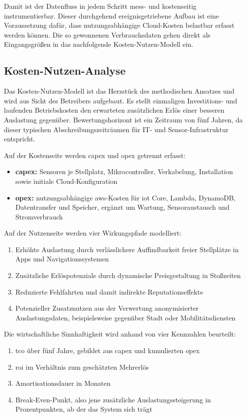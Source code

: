 Damit ist der Datenfluss in jedem Schritt mess- und kostenseitig instrumentierbar. Dieser durchgehend ereignisgetriebene Aufbau ist eine Voraussetzung dafür, dass nutzungsabhängige Cloud-Kosten belastbar erfasst werden können. Die so gewonnenen Verbrauchsdaten gehen direkt als Eingangsgrößen in das nachfolgende Kosten-Nutzen-Modell ein.

\subsection{Kosten-Nutzen-Analyse}

Das Kosten-Nutzen-Modell ist das Herzstück des methodischen Ansatzes und wird aus Sicht des Betreibers aufgebaut. Es stellt einmaligen Investitions- und laufenden Betriebskosten den erwarteten zusätzlichen Erlös einer besseren Auslastung gegenüber. Bewertungshorizont ist ein Zeitraum von fünf Jahren, da dieser typischen Abschreibungszeiträumen für IT- und Sensor-Infrastruktur entspricht.

Auf der Kostenseite werden \ac{capex} und \ac{opex} getrennt erfasst:
\begin{itemize}
    \item \textbf{\ac{capex}:} Sensoren je Stellplatz, Mikrocontroller, Verkabelung, Installation sowie initiale Cloud-Konfiguration
    \item \textbf{\ac{opex}:} nutzungsabhängige \ac{aws}-Kosten für \ac{iot} Core, Lambda, DynamoDB, Datentransfer und Speicher, ergänzt um Wartung, Sensoraustausch und Stromverbrauch
\end{itemize}

Auf der Nutzenseite werden vier Wirkungspfade modelliert:
\begin{enumerate}
    \item Erhöhte Auslastung durch verlässlichere Auffindbarkeit freier Stellplätze in Apps und Navigationssystemen \citep{alaanzyRealTimeSmart2025}
    \item Zusätzliche Erlöspotenziale durch dynamische Preisgestaltung in Stoßzeiten \citep{hassineDynamicPricingRoute2024,sarkerSmartParkingSystem2020}
    \item Reduzierte Fehlfahrten und damit indirekte Reputationseffekte
    \item Potenzieller Zusatznutzen aus der Verwertung anonymisierter Auslastungsdaten, beispielsweise gegenüber Stadt oder Mobilitätsdiensten \citep{wangEconomicsSmartParking2025}
\end{enumerate}

Die wirtschaftliche Sinnhaftigkeit wird anhand von vier Kennzahlen beurteilt:
\begin{enumerate}
    \item \ac{tco} über fünf Jahre, gebildet aus \ac{capex} und kumulierten \ac{opex}
    \item \ac{roi} im Verhältnis zum geschätzten Mehrerlös
    \item Amortisationsdauer in Monaten
    \item Break-Even-Punkt, also jene zusätzliche Auslastungssteigerung in Prozentpunkten, ab der das System sich trägt
\end{enumerate}

